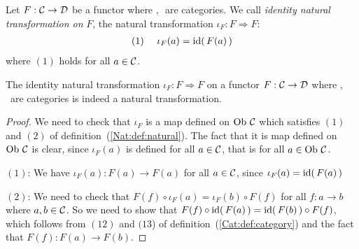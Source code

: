 \begin{defin}\label{Nat:def:identity}
    Let $F:\mbox{$\cal C$}\to\mbox{$\cal D$}$ be a functor where \Cat,\,\Dat\ are categories. 
    We call {\em identity natural transformation on} $F$, the 
    natural transformation $\iota_{F}:F\Rightarrow F$:
        \begin{eqnarray*}
            (1)&\ &\iota_{F}(a)=\mbox{\rm id}(\,F(a)\,)
        \end{eqnarray*}
    where $(1)$ holds for all $a\in\mbox{$\cal C$}$.
\end{defin}

\begin{prop}\label{Nat:prop:identity}
    The identity natural transformation $\iota_{F}:F\Rightarrow F$ on a
    functor $F:\mbox{$\cal C$}\to\mbox{$\cal D$}$ where \Cat,\,\Dat\ are categories is indeed
    a natural transformation.
\end{prop}
\begin{proof}
    We need to check that $\iota_{F}$ is a map defined on $\mbox{\rm Ob}\ \mbox{$\cal C$}$
    which satisfies $(1)$ and $(2)$ of definition~(\ref{Nat:def:natural}).
    The fact that it is map defined on $\mbox{\rm Ob}\ \mbox{$\cal C$}$ is clear, since
    $\iota_{F}(a)$ is defined for all $a\in\mbox{$\cal C$}$, that is for all 
    $a\in\mbox{\rm Ob}\ \mbox{$\cal C$}$.

    $(1)$: We have $\iota_{F}(a):F(a)\to F(a)$ for all $a\in\mbox{$\cal C$}$,
    since $\iota_{F}(a)=\mbox{\rm id}(\,F(a)\,)$

    $(2)$: We need to check that $F(f)\circ\iota_{F}(a) = \iota_{F}(b)\circ F(f)$
    for all  $f:a\to b$ where $a,b\in\mbox{$\cal C$}$. So we need to show that
    $F(f)\circ\mbox{\rm id}(\,F(a)\,)=\mbox{\rm id}(\,F(b)\,)\circ F(f)$, which follows
    from $(12)$ and $(13$) of definition~(\ref{Cat:def:category})
    and the fact that $F(f):F(a)\to F(b)$.
\end{proof}
